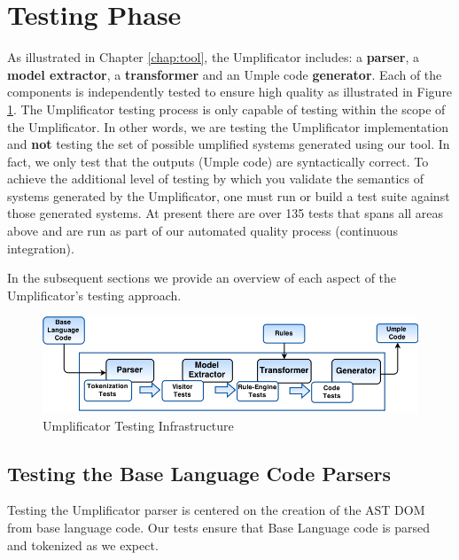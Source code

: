 \section{Testing Phase}
\label{sec:testingUmplificator}
As illustrated in Chapter \ref{chap:tool}, the Umplificator includes: a \textbf{parser}, a \textbf{model extractor}, a \textbf{transformer} and an Umple code \textbf{generator}. Each of the components is independently tested to ensure high quality as illustrated in Figure \ref{fig:testingPhase}. The Umplificator testing process is only capable of testing within the scope of the Umplificator. In other words, we are testing the Umplificator implementation and \textbf{not} testing the set of possible umplified systems generated using our tool. In fact, we only test that the outputs (Umple code) are syntactically correct. To achieve the additional level of testing by which you validate the semantics of systems generated by the Umplificator, one must run or build a test suite against those generated systems. At present there are over 135 tests that spans all areas above and are run as part of our automated quality process (continuous integration).


In the subsequent sections we provide an overview of each aspect of the Umplificator's testing approach. 

\begin{figure}[h]
\centering
\includegraphics[width=1\textwidth]{Figures/testingPhase.png} 
\caption{Umplificator Testing Infrastructure}
\label{fig:testingPhase}
\end{figure}


\subsection{Testing the Base Language Code Parsers}

Testing the Umplificator parser is centered on the creation of the AST DOM from base language code. Our tests ensure that Base Language code is parsed and tokenized as we expect.


